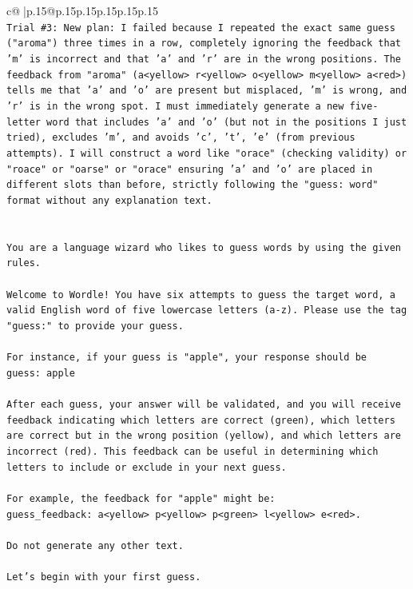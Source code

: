 \documentclass{article}
\begin{document}
{\begin{supertabular}{c@{$\;$}|p{.15\linewidth}@{}p{.15\linewidth}p{.15\linewidth}p{.15\linewidth}p{.15\linewidth}p{.15\linewidth}}
{{{\\ 
\texttt{Trial \#3: New plan: I failed because I repeated the exact same guess ("aroma") three times in a row, completely ignoring the feedback that 'm' is incorrect and that 'a' and 'r' are in the wrong positions. The feedback from "aroma" (a<yellow> r<yellow> o<yellow> m<yellow> a<red>) tells me that 'a' and 'o' are present but misplaced, 'm' is wrong, and 'r' is in the wrong spot. I must immediately generate a new five{-}letter word that includes 'a' and 'o' (but not in the positions I just tried), excludes 'm', and avoids 'c', 't', 'e' (from previous attempts). I will construct a word like "orace" (checking validity) or "roace" or "oarse" or "orace" ensuring 'a' and 'o' are placed in different slots than before, strictly following the "guess: word" format without any explanation text.} \\
\\ 
\\ 
\texttt{You are a language wizard who likes to guess words by using the given rules.} \\
\\ 
\texttt{Welcome to Wordle! You have six attempts to guess the target word, a valid English word of five lowercase letters (a{-}z). Please use the tag "guess:" to provide your guess.} \\
\\ 
\texttt{For instance, if your guess is "apple", your response should be} \\
\texttt{guess: apple} \\
\\ 
\texttt{After each guess, your answer will be validated, and you will receive feedback indicating which letters are correct (green), which letters are correct but in the wrong position (yellow), and which letters are incorrect (red). This feedback can be useful in determining which letters to include or exclude in your next guess.} \\
\\ 
\texttt{For example, the feedback for "apple" might be:} \\
\texttt{guess\_feedback: a<yellow> p<yellow> p<green> l<yellow> e<red>.} \\
\\ 
\texttt{Do not generate any other text.} \\
\\ 
\texttt{Let's begin with your first guess.} \\
            }
        }
    }
     \\ \\


\end{supertabular}}
\end{document}
